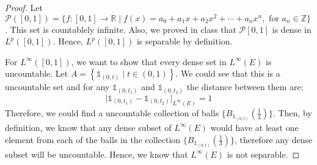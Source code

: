 \begin{answer}
    \begin{proof}
        Let $\mathcal{P}([0,1]) = \{f: [0,1] \to \mathbb{R} \mid f(x) = a_0 + a_1x + a_2x^2 + \cdots + a_n x^n, \text{ for } a_n\in \mathbb{Z} \}$. This set is countablely infinite. Also, we proved in class that $\mathcal{P}[0,1]$ is dense in $L^{p}([0,1])$. Hence, $L^p([0,1])$ is separable by definition.
        
        For $L^{\infty}([0,1])$, we want to show that every dense set in $L^{\infty}(E)$ is uncountable. Let $A = \left\{\mathbb{1}_{(0, t)}\mid t \in(0,1)\right\}$. We could see that this is a uncountable set and for any $\mathbb{1}_{(0,t_1)}$ and $\mathbb{1}_{(0,t_2)}$ the distance between them are:
        \begin{equation}
            \lvert \mathbb{1}_{(0,t_1)} - \mathbb{1}_{(0,t_2)} \rvert_{L^{\infty}(E)} = 1
        \end{equation}
        Therefore, we could find a uncountable collection of balls $\{B_{\mathbb{1}_{(0,t)}}(\tfrac{1}{3})\}$. Then, by definition, we know that any dense subset of $L^{\infty}(E)$ would have at least one element from each of the balls in the collection $\{B_{\mathbb{1}_{(0,t)}}(\tfrac{1}{3})\}$, therefore any dense subset will be uncountable. Hence, we know that $L^{\infty}(E)$ is not separable.
    \end{proof}
\end{answer}